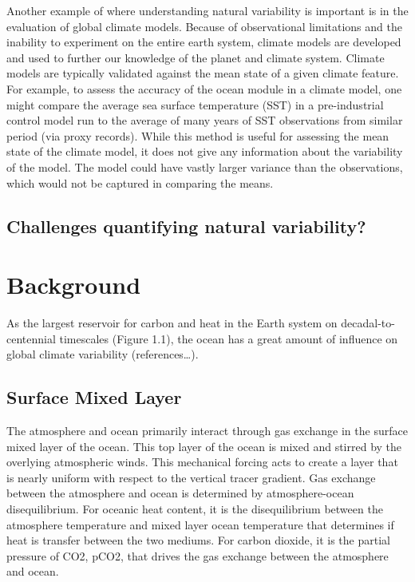 Another example of where understanding natural variability is important is in the evaluation of global climate models. Because of observational limitations and the inability to experiment on the entire earth system, climate models are developed and used to further our knowledge of the planet and climate system. Climate models are typically validated against the mean state of a given climate feature. For example, to assess the accuracy of the ocean module in a climate model, one might compare the average sea surface temperature (SST) in a pre-industrial control model run to the average of many years of SST observations from similar period (via proxy records). While this method is useful for assessing the mean state of the climate model, it does not give any information about the variability of the model. The model could have vastly larger variance than the observations, which would not be captured in comparing the means.

\subsection{Challenges quantifying natural variability?}


\section{Background}
As the largest reservoir for carbon and heat in the Earth system on decadal-to-centennial timescales (Figure 1.1), the ocean has a great amount of influence on global climate variability (references…).

\subsection{Surface Mixed Layer}
The atmosphere and ocean primarily interact through gas exchange in the surface mixed layer of the ocean. This top layer of the ocean is mixed and stirred by the overlying atmospheric winds. This mechanical forcing acts to create a layer that is nearly uniform with respect to the vertical tracer gradient. Gas exchange between the atmosphere and ocean is determined by atmosphere-ocean disequilibrium. For oceanic heat content, it is the disequilibrium between the atmosphere temperature and mixed layer ocean temperature that determines if heat is transfer between the two mediums. For carbon dioxide, it is the partial pressure of CO2, pCO2, that drives the gas exchange between the atmosphere and ocean.

